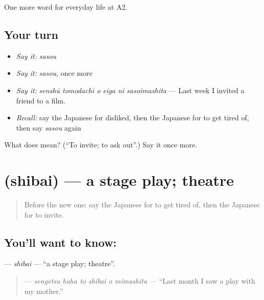 \begin{grammarlens}[title={What you've built}]
One more word for everyday life at A2.
\end{grammarlens}

\subsection*{Your turn}
\begin{itemize}
\raggedright
  \item \emph{Say it:} \emph{sasou}
  \item \emph{Say it:} \emph{sasou}, once more
  \item \emph{Say it:} \emph{senshū tomodachi o eiga ni sasoimashita} — Last week I invited a friend to a film.
  \item \emph{Recall:} say the Japanese for disliked, then the Japanese for to get tired of, then say \emph{sasou} again
\end{itemize}

\begin{tcolorbox}[breakable,colback=teal!4,colframe=teal!35!black,title={Before you move on}]
What does  mean? (\textquotedblleft{}To invite; to ask out\textquotedblright{}.) Say it once more.
\end{tcolorbox}
\section[\texorpdfstring{\ja{しばい} (shibai)}{しばい (shibai)}]{ (shibai) — a stage play; theatre}

\label{lesson:JA-C241-shibai}



\begin{quote}
Before the new one: say the Japanese for to get tired of, then the Japanese for to invite.
\end{quote}

\subsection*{You'll want to know: }
\textbf{} — \emph{shibai} — \textquotedblleft{}a stage play; theatre\textquotedblright{}.

\begin{quote}
\textbf{   } — \emph{sengetsu haha to shibai o mimashita} — \textquotedblleft{}Last month I saw a play with my mother.\textquotedblright{}
\end{quote}

